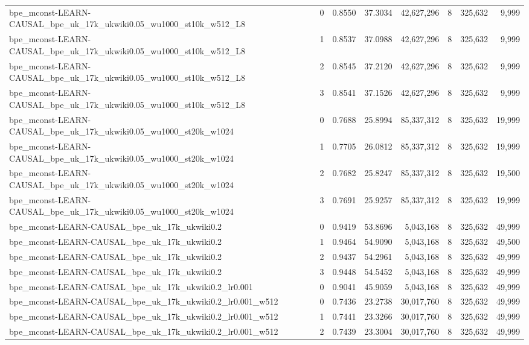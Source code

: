 \begin{tabular}{lrrrrrrr}
bpe\_mconst-LEARN-CAUSAL\_bpe\_uk\_17k\_ukwiki0.05\_wu1000\_st10k\_w512\_L8 & 0 & 0.8550 & 37.3034 & 42,627,296 & 8 & 325,632 & 9,999 \\
bpe\_mconst-LEARN-CAUSAL\_bpe\_uk\_17k\_ukwiki0.05\_wu1000\_st10k\_w512\_L8 & 1 & 0.8537 & 37.0988 & 42,627,296 & 8 & 325,632 & 9,999 \\
bpe\_mconst-LEARN-CAUSAL\_bpe\_uk\_17k\_ukwiki0.05\_wu1000\_st10k\_w512\_L8 & 2 & 0.8545 & 37.2120 & 42,627,296 & 8 & 325,632 & 9,999 \\
bpe\_mconst-LEARN-CAUSAL\_bpe\_uk\_17k\_ukwiki0.05\_wu1000\_st10k\_w512\_L8 & 3 & 0.8541 & 37.1526 & 42,627,296 & 8 & 325,632 & 9,999 \\
bpe\_mconst-LEARN-CAUSAL\_bpe\_uk\_17k\_ukwiki0.05\_wu1000\_st20k\_w1024 & 0 & 0.7688 & 25.8994 & 85,337,312 & 8 & 325,632 & 19,999 \\
bpe\_mconst-LEARN-CAUSAL\_bpe\_uk\_17k\_ukwiki0.05\_wu1000\_st20k\_w1024 & 1 & 0.7705 & 26.0812 & 85,337,312 & 8 & 325,632 & 19,999 \\
bpe\_mconst-LEARN-CAUSAL\_bpe\_uk\_17k\_ukwiki0.05\_wu1000\_st20k\_w1024 & 2 & 0.7682 & 25.8247 & 85,337,312 & 8 & 325,632 & 19,500 \\
bpe\_mconst-LEARN-CAUSAL\_bpe\_uk\_17k\_ukwiki0.05\_wu1000\_st20k\_w1024 & 3 & 0.7691 & 25.9257 & 85,337,312 & 8 & 325,632 & 19,999 \\
bpe\_mconst-LEARN-CAUSAL\_bpe\_uk\_17k\_ukwiki0.2 & 0 & 0.9419 & 53.8696 & 5,043,168 & 8 & 325,632 & 49,999 \\
bpe\_mconst-LEARN-CAUSAL\_bpe\_uk\_17k\_ukwiki0.2 & 1 & 0.9464 & 54.9090 & 5,043,168 & 8 & 325,632 & 49,500 \\
bpe\_mconst-LEARN-CAUSAL\_bpe\_uk\_17k\_ukwiki0.2 & 2 & 0.9437 & 54.2961 & 5,043,168 & 8 & 325,632 & 49,999 \\
bpe\_mconst-LEARN-CAUSAL\_bpe\_uk\_17k\_ukwiki0.2 & 3 & 0.9448 & 54.5452 & 5,043,168 & 8 & 325,632 & 49,999 \\
bpe\_mconst-LEARN-CAUSAL\_bpe\_uk\_17k\_ukwiki0.2\_lr0.001 & 0 & 0.9041 & 45.9059 & 5,043,168 & 8 & 325,632 & 49,999 \\
bpe\_mconst-LEARN-CAUSAL\_bpe\_uk\_17k\_ukwiki0.2\_lr0.001\_w512 & 0 & 0.7436 & 23.2738 & 30,017,760 & 8 & 325,632 & 49,999 \\
bpe\_mconst-LEARN-CAUSAL\_bpe\_uk\_17k\_ukwiki0.2\_lr0.001\_w512 & 1 & 0.7441 & 23.3266 & 30,017,760 & 8 & 325,632 & 49,999 \\
bpe\_mconst-LEARN-CAUSAL\_bpe\_uk\_17k\_ukwiki0.2\_lr0.001\_w512 & 2 & 0.7439 & 23.3004 & 30,017,760 & 8 & 325,632 & 49,999 \\

\end{tabular}
